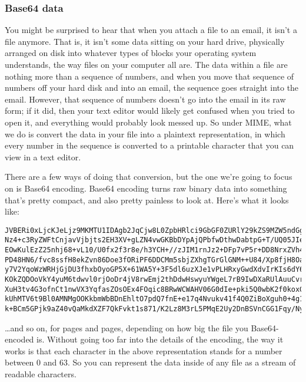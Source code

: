 \documentclass[11pt]{article}
\begin{document}
\subsubsection{Base64 data}
\label{sec:org4590543}

You might be surprised to hear that when you attach a file to an
email, it isn't a file anymore.  That is, it isn't some data sitting
on your hard drive, physically arranged on disk into whatever types of
blocks your operating system understands, the way files on your
computer all are.  The data within a file are nothing more than a
sequence of numbers, and when you move that sequence of numbers off
your hard disk and into an email, the sequence goes straight into the
email.  However, that sequence of numbers doesn't go into the email in
its raw form; if it did, then your text editor would likely get
confused when you tried to open it, and everything would probably look
messed up.  So under MIME, what we do is convert the data in your file
into a plaintext representation, in which every number in the sequence
is converted to a printable character that you can view in a text
editor.

There are a few ways of doing that conversion, but the one we're going
to focus on is Base64 encoding.  Base64 encoding turns raw binary data
into something that's pretty compact, and also pretty painless to look
at.  Here's what it looks like:

\begin{verbatim}
JVBERi0xLjcKJeLjz9MKMTU1IDAgb2JqCjw8L0ZpbHRlci9GbGF0ZURlY29kZS9MZW5ndGggMTI1
Nz4+c3RyZWFtCnjavVjbjts2EH3XV+gLZN4vwGKBbDYpAjQPbfwDthwDabtpG+T/UQ05JIeySCtp
EOwKulEzZ25nhj68+vL10/U0fx2f3r8e/h3YCH+//zJIM1rnJz2+DFp7vP5r+DD8NrxZVh4+/HP6
PD48HN6/fvc8ssfH8ekZvn86Doe3fORiPF6DDCMm5sbjZXhgTGrGlGNM++U84/Xp8fjH8Oa4KZdv
y7V2YqoWzWRHjGjDU3fhxbOyoGP5X+61WA5Y+3F5dl6uzXJe1vPLHRxyGwdXdvIrKIs6dY6qQa0A
KOkZQDOoVkY4yuM6tdwvl0rjOoDr4jV8rwEmj2thDdwHswyuYWgeL7rB9IwDXaRUlAuuCvrn6JKw
XuH3tv4G3ofnCt1nwVX3YqfasZOsOEx4FOqic8BRwWCWAHV06G0dIe+pki5Q0wbK2f0koxG5m0i2
kUhMTV6t9Bl0AMNMgOOKkbmWbBDnEhltO7pdQ7fnE+e17q4Nvukv41f4Q0ZiBoXguh0+4g1S4sBw
k+BCm5GPjk9aZ40vQaMkdXZF7QkFvkt1s871/K2Lz8M3rL5PMqE2Uy2DnBSVnCGG1Fqy/NyzuEGX
\end{verbatim}

\ldots{}and so on, for pages and pages, depending on how big the file you
Base64-encoded is.  Without going too far into the details of the
encoding, the way it works is that each character in the above
representation stands for a number between 0 and 63.  So you can
represent the data inside of any file as a stream of readable
characters.
\end{document}
